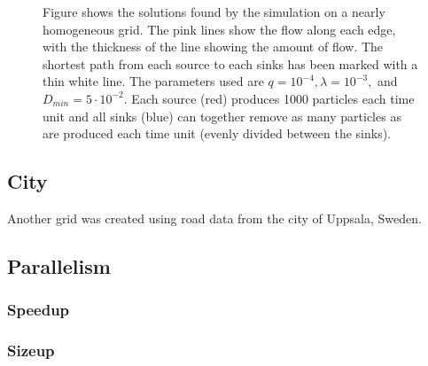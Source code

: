\begin{figure}
\begin{subfigure}[b]{0.48\textwidth}
\end{subfigure}
\caption{Figure shows the solutions found by the simulation on a nearly homogeneous grid. The pink lines show the flow along each edge, with the thickness of the line showing the amount of flow. The shortest path from each source to each sinks has been marked with a thin white line. The parameters used are $q = 10^{-4},\lambda = 10^{-3},$ and $D_{min}=5 \cdot 10^{-2}$. Each source (red) produces 1000 particles each time unit and all sinks (blue) can together remove as many particles as are produced each time unit (evenly divided between the sinks).}
\label{fig:homogeneous}
\end{figure}

\subsection{City}

Another grid was created using road data from the city of Uppsala, Sweden.

\subsection{Parallelism}
\subsubsection{Speedup}

\subsubsection{Sizeup}
